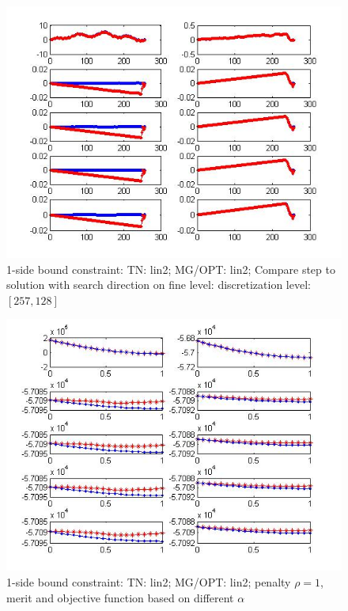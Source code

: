 \documentclass[10pt]{article}
\begin{document}
\begin{figure}
  \centering
  \includegraphics[width=1\textwidth]{finedir1s22}
  \caption{1-side bound constraint:   TN: lin2; MG/OPT: lin2; Compare step to solution with search direction on fine level: discretization level: $[257,128]$}
  \label{fig:fine1s22}
\end{figure}

 
\begin{figure}
  \centering
  \includegraphics[width=1\textwidth]{merit1s22}
  \caption{1-side bound constraint:   TN: lin2; MG/OPT: lin2; penalty $\rho=1$, merit and objective function based on different $\alpha$}
  \label{fig:merit22}
\end{figure}
\end{document}
